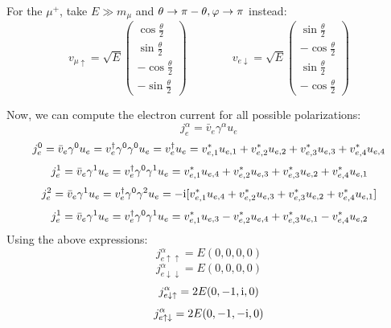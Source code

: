 For the $ \mu^+ $, take $ E \gg m_\mu $ and $ \theta \rightarrow \pi - \theta , \varphi \rightarrow \pi $ instead:
\begin{equation*}
  v_{\mu \uparrow} = \sqrt{E}
  \begin{pmatrix}
    \cos \frac{\theta}{2} \\ \sin \frac{\theta}{2} \\ - \cos \frac{\theta}{2} \\ - \sin \frac{\theta}{2}
  \end{pmatrix}
  \qquad \qquad
  v_{e \downarrow} = \sqrt{E}
  \begin{pmatrix}
    \sin \frac{\theta}{2} \\ - \cos \frac{\theta}{2} \\ \sin \frac{\theta}{2} \\ - \cos \frac{\theta}{2}
  \end{pmatrix}
\end{equation*}

Now, we can compute the electron current for all possible polarizations:
\begin{equation}
  j_e^\alpha = \bar{v}_e \gamma^\alpha u_e
\end{equation}
\begin{equation*}
  j_e^0 = \bar{v}_e \gamma^0 u_e = v_e^\dagger \gamma^0 \gamma^0 u_e = v_e^\dagger u_e = v_{e,1}^* u_{e,1} + v_{e,2}^* u_{e,2} + v_{e,3}^* u_{e,3} + v_{e,4}^* u_{e,4}
\end{equation*}
\begin{equation*}
  j_e^1 = \bar{v}_e \gamma^1 u_e = v_e^\dagger \gamma^0 \gamma^1 u_e = v_{e,1}^* u_{e,4} + v_{e,2}^* u_{e,3} + v_{e,3}^* u_{e,2} + v_{e,4}^* u_{e,1}
\end{equation*}
\begin{equation*}
  j_e^2 = \bar{v}_e \gamma^1 u_e = v_e^\dagger \gamma^0 \gamma^2 u_e = -\mathrm{i} [ v_{e,1}^* u_{e,4} + v_{e,2}^* u_{e,3} + v_{e,3}^* u_{e,2} + v_{e,4}^* u_{e,1} ]
\end{equation*}
\begin{equation*}
  j_e^1 = \bar{v}_e \gamma^1 u_e = v_e^\dagger \gamma^0 \gamma^1 u_e = v_{e,1}^* u_{e,3} - v_{e,2}^* u_{e,4} + v_{e,3}^* u_{e,1} - v_{e,4}^* u_{e,2}
\end{equation*}
Using the above expressions:
\begin{equation*}
  j_{e \uparrow \uparrow}^\alpha = E (0,0,0,0)
\end{equation*}
\begin{equation*}
  j_{e \downarrow \downarrow}^\alpha = E (0,0,0,0)
\end{equation*}
\begin{equation*}
  j_{e \downarrow \uparrow}^\alpha = 2E (0,-1,\mathrm{i},0)
\end{equation*}
\begin{equation*}
  j_{e \uparrow \downarrow}^\alpha = 2E (0,-1,-\mathrm{i},0)
\end{equation*}

